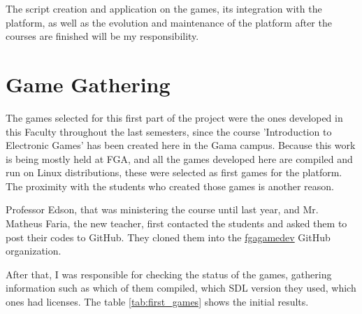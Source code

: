 The script creation and application on the games, its integration with the platform, as well as the evolution and maintenance of the platform after the courses are finished will be my responsibility.


\section[Game Gathering]{Game Gathering}

The games selected for this first part of the project were the ones developed in this Faculty throughout the last semesters, since the course 'Introduction to Electronic Games' has been created here in the Gama campus. Because this work is being mostly held at FGA, and all the games developed here are compiled and run on Linux distributions, these were selected as first games for the platform. The proximity with the students who created those games is another reason.

Professor Edson, that was ministering the course until last year, and Mr. Matheus Faria, the new teacher, first contacted the students and asked them to post their codes to GitHub. They cloned them into the \href{https://github.com/fgagamedev/}{fgagamedev} GitHub organization.

After that, I was responsible for checking the status of the games, gathering information such as which of them compiled, which SDL version they used, which ones had licenses. The table \ref{tab:first_games} shows the initial results.

